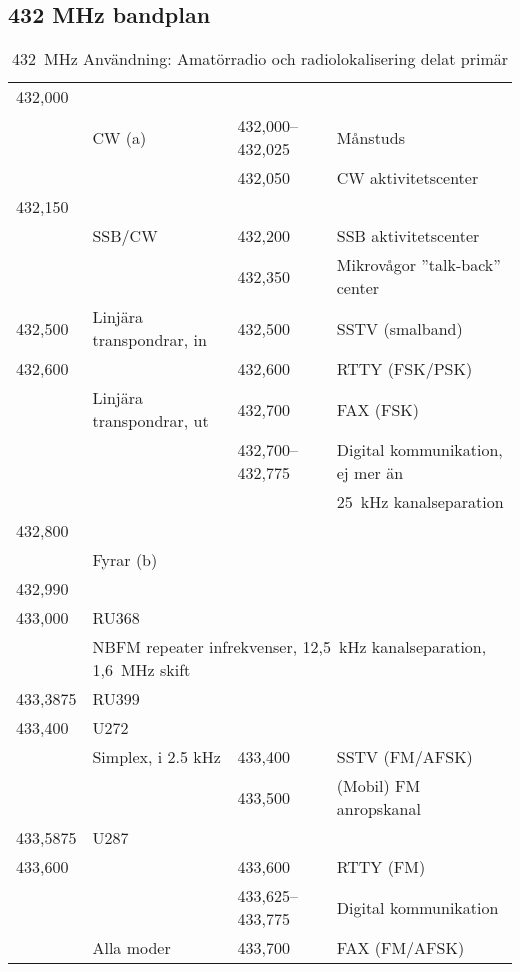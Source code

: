 \subsection{432 MHz bandplan}

\setlongtables
\begin{longtable}{llll}
\caption{432~MHz Användning: Amatörradio och radiolokalisering delat primär} \\
432,000 &        & & \\
        & CW (a) & 432,000--432,025 & Månstuds \\
        &        & 432,050           & CW aktivitetscenter \\
432,150 &        & & \\
        & SSB/CW & 432,200           & SSB aktivitetscenter \\
        &        & 432,350           & Mikrovågor ''talk-back'' center \\
432,500 & Linjära transpondrar, in & 432,500 & SSTV (smalband) \\
432,600 &                          & 432,600 & RTTY (FSK/PSK) \\
        & Linjära transpondrar, ut & 432,700 & FAX (FSK) \\
        &                          & 432,700--432,775 & Digital kommunikation, ej mer än \\
        &                          &         & 25~kHz kanalseparation \\
432,800 & & & \\
        & \multicolumn{3}{l}{Fyrar (b)} \\
432,990 & & & \\
433,000 & RU368 & & \\
        & \multicolumn{3}{l}{NBFM repeater infrekvenser, 12,5~kHz kanalseparation, 1,6~MHz skift} \\
433,3875 & RU399 & & \\
433,400 & U272 & & \\
        & Simplex, i 2.5 kHz & 433,400 & SSTV (FM/AFSK) \\
        &                    & 433,500 & (Mobil) FM anropskanal \\
433,5875 & U287 & & \\
433,600 &            & 433,600           & RTTY (FM) \\
        &            & 433,625--433,775 & Digital kommunikation \\
        & Alla moder & 433,700           & FAX (FM/AFSK) \\

\end{longtable}
